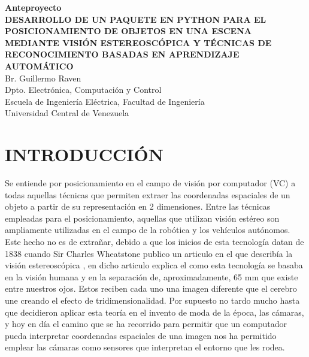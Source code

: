\documentclass[letterpaper,titlepage,12pt,oneside,spanish,final]{report_eie}
\numberwithin{equation}{chapter}%
\numberwithin{figure}{chapter}%
\numberwithin{table}{chapter}%
\numberwithin{definition}{chapter}%
\numberwithin{lemma}{chapter}%
\numberwithin{theorem}{chapter}%
\numberwithin{corollary}{chapter}%
\numberwithin{condition}{chapter}%
\numberwithin{criterion}{chapter}%
\numberwithin{problem}{chapter}%
\numberwithin{property}{chapter}%
\numberwithin{proposition}{chapter}%
\numberwithin{solution}{chapter}%
\numberwithin{conjecture}{chapter}%
\renewcommand{\baselinestretch}{1.5}%
\begin{document}
\renewcommand{\baselinestretch}{1.0}%
\begin{center}
\huge{\textbf{Anteproyecto}}\\
\vspace{5cm}
\large{\textbf{DESARROLLO DE UN PAQUETE EN PYTHON PARA EL POSICIONAMIENTO DE OBJETOS EN UNA ESCENA MEDIANTE VISIÓN ESTEREOSCÓPICA Y TÉCNICAS DE RECONOCIMIENTO BASADAS EN APRENDIZAJE AUTOMÁTICO
 }}
\vspace{0.5cm}
\\
Br. Guillermo Raven\\
Dpto. Electrónica, Computación y Control\\
Escuela de Ingeniería Eléctrica,
Facultad de Ingeniería\\
Universidad Central de Venezuela\\
\end{center}
\vspace{0.8cm}

\begin{flushleft}
\begin{spacing}{1}
\end{spacing}
\end{flushleft}
\justifying
\chapter*{INTRODUCCIÓN}\label{CAP:intro}
\setlength{\parskip}{14pt}%
%

%
Se entiende por posicionamiento en el campo de visión por computador (VC) a todas aquellas técnicas que permiten extraer las coordenadas espaciales de un objeto a partir de su representación en 2 dimensiones. Entre las técnicas empleadas para el posicionamiento, aquellas que utilizan visión estéreo son ampliamente utilizadas en el campo de la robótica y los vehículos autónomos. Este hecho no es de extrañar, debido a que los inicios de esta tecnología datan de 1838 cuando Sir Charles Wheatstone publico un articulo en el que describía la visión estereoscópica \cite{Wheatstone1837}, en dicho articulo explica el como esta tecnología se basaba en la visión humana y en la separación de, aproximadamente, 65 mm que existe entre nuestros ojos. Estos reciben cada uno una imagen diferente que el cerebro une creando el efecto de tridimensionalidad. Por supuesto no tardo mucho hasta que decidieron aplicar esta teoría en el invento de moda de la época, las cámaras, y hoy en día el camino que se ha recorrido para permitir que un computador pueda interpretar coordenadas espaciales de una imagen nos ha permitido emplear las cámaras como sensores que interpretan el entorno que les rodea. 
\end{document}

